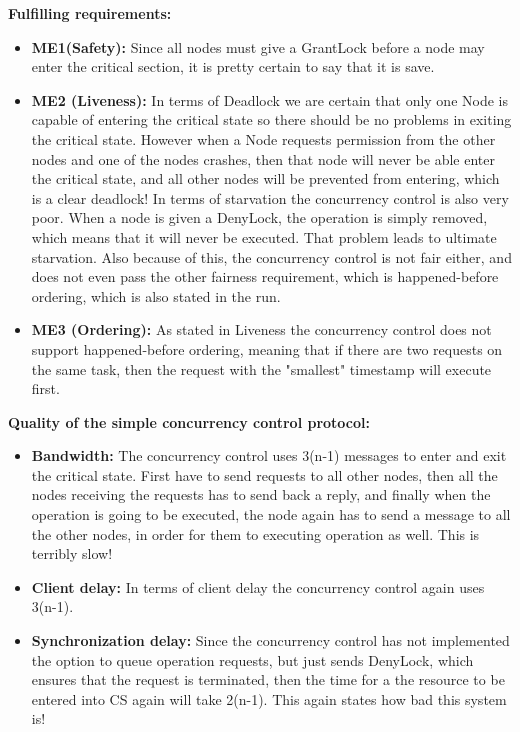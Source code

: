 \textbf{Fulfilling requirements:}
\begin{itemize} 
\item \textbf{ME1(Safety):} Since all nodes must give a GrantLock before a node may enter the critical section, it is pretty certain to say that it is save. 
\item \textbf{ME2 (Liveness):} In terms of Deadlock we are certain that only one Node is capable of entering the critical state so there should be no problems in exiting the critical state. However when a Node requests permission from the other nodes and one of the nodes crashes, then that node will never be able enter the critical state, and all other nodes will be prevented from entering, which is a clear deadlock! In terms of starvation the concurrency control is also very poor. When a node is given a DenyLock, the operation is simply removed, which means that it will never be executed. That problem leads to ultimate starvation. Also because of this, the concurrency control is not fair either, and does not even pass the other fairness requirement, which is happened-before ordering, which is also stated in the run.
\item \textbf{ME3 (Ordering):} As stated in Liveness the concurrency control does not support happened-before ordering, meaning that if there are two requests on the same task, then the request with the "smallest" timestamp will execute first.
\end{itemize}

\textbf{Quality of the simple concurrency control protocol:}
\begin{itemize}
\item \textbf{Bandwidth:} The concurrency control uses 3(n-1) messages to enter and exit the critical state. First have to send requests to all other nodes, then all the nodes receiving the requests has to send back a reply, and finally when the operation is going to be executed, the node again has to send a message to all the other nodes, in order for them to executing operation as well. This is terribly slow!
\item \textbf{Client delay:} In terms of client delay the concurrency control again uses 3(n-1).
\item \textbf{Synchronization delay:} Since the concurrency control has not implemented the option to queue operation requests, but just sends DenyLock, which ensures that the request is terminated, then the time for a the resource to be entered into CS again will take 2(n-1). This again states how bad this system is!
\end{itemize}

